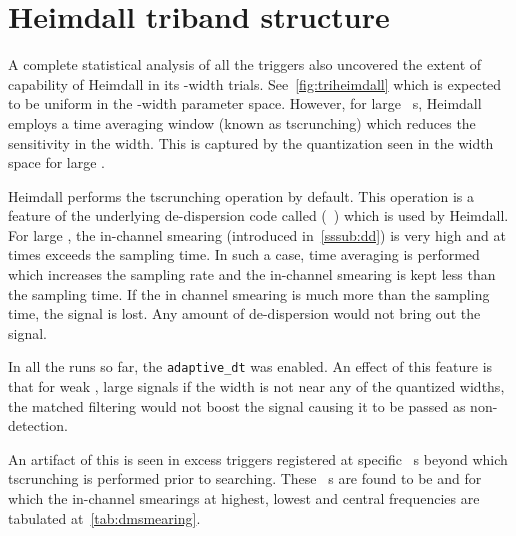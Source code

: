 \begin{figure}
	\label{fig:rfidm150}
	\caption{}
\end{figure}

\section {Heimdall triband structure}
\par A complete statistical analysis of all the triggers also uncovered the extent of capability of Heimdall in its \dm-width trials.
See~\autoref{fig:triheimdall} which is expected to be uniform in the \dm-width parameter space. 
However, for large \dm~s, Heimdall employs a time averaging window (known as tscrunching) which reduces the sensitivity in the width. 
This is captured by the quantization seen in the width space for large \dm.

\par Heimdall performs the tscrunching operation by default. 
This operation is a feature of the underlying de-dispersion code called (~\cite{dedisp}) which is used by Heimdall. 
For large \dm, the in-channel smearing (introduced in~\autoref{sssub:dd}) is very high and at times exceeds the sampling time. In such a case, time averaging is performed which increases the sampling rate and the in-channel smearing is kept less than the sampling time.
If the in channel smearing is much more than the sampling time, the signal is lost. Any amount of de-dispersion would not bring out the signal.

\par In all the runs so far, the \texttt{adaptive\_dt} was enabled. 
An effect of this feature is that for weak \sn, large \dm signals if the width is not near any of the quantized widths, the matched filtering would not boost the signal causing it to be passed as non-detection.

\par An artifact of this is seen in excess triggers registered at specific \dm~s beyond which tscrunching is performed prior to searching.
These \dm~s are found to be  and  for which the in-channel smearings at highest, lowest and central frequencies are tabulated at~\autoref{tab:dmsmearing}.

